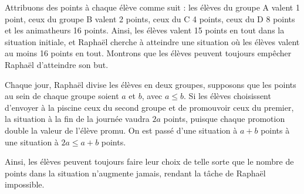 Attribuons des points à chaque élève comme suit : les élèves du groupe A valent 1 point, ceux du groupe B valent 2 points, ceux du C 4 points, ceux du D 8 points et les animatheurs 16 points. Ainsi, les élèves valent 15 points en tout dans la situation initiale, et Raphaël cherche à atteindre une situation où les élèves valent au moins 16 points en tout. Montrons que les élèves peuvent toujours empêcher Raphaël d'atteindre son but.

Chaque jour, Raphaël divise les élèves en deux groupes, supposons que les points au sein de chaque groupe soient $a$ et $b$, avec $a\le b$. Si les élèves choisissent d'envoyer à la piscine ceux du second groupe et de promouvoir ceux du premier, la situation à la fin de la journée vaudra $2a$ points, puisque chaque promotion double la valeur de l'élève promu. On est passé d'une situation à $a+b$ points à une situation à $2a \le a + b$ points.

Ainsi, les élèves peuvent toujours faire leur choix de telle sorte que le nombre de points dans la situation n'augmente jamais, rendant la tâche de Raphaël impossible.